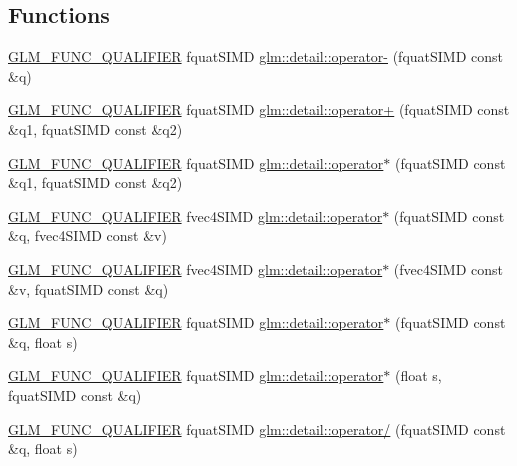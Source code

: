 \subsection*{Functions}
\begin{DoxyCompactItemize}
\item 
\hyperlink{setup_8hpp_a33fdea6f91c5f834105f7415e2a64407}{G\+L\+M\+\_\+\+F\+U\+N\+C\+\_\+\+Q\+U\+A\+L\+I\+F\+I\+ER} fquat\+S\+I\+MD \hyperlink{namespaceglm_1_1detail_a07dbb5e436fcb64a3c165a15c920a484}{glm\+::detail\+::operator-\/} (fquat\+S\+I\+MD const \&q)
\item 
\hyperlink{setup_8hpp_a33fdea6f91c5f834105f7415e2a64407}{G\+L\+M\+\_\+\+F\+U\+N\+C\+\_\+\+Q\+U\+A\+L\+I\+F\+I\+ER} fquat\+S\+I\+MD \hyperlink{namespaceglm_1_1detail_a0010f5683721f2724e0e00709fc51405}{glm\+::detail\+::operator+} (fquat\+S\+I\+MD const \&q1, fquat\+S\+I\+MD const \&q2)
\item 
\hyperlink{setup_8hpp_a33fdea6f91c5f834105f7415e2a64407}{G\+L\+M\+\_\+\+F\+U\+N\+C\+\_\+\+Q\+U\+A\+L\+I\+F\+I\+ER} fquat\+S\+I\+MD \hyperlink{namespaceglm_1_1detail_a6e7c8ca42117ec6c0c60b765f083557b}{glm\+::detail\+::operator$\ast$} (fquat\+S\+I\+MD const \&q1, fquat\+S\+I\+MD const \&q2)
\item 
\hyperlink{setup_8hpp_a33fdea6f91c5f834105f7415e2a64407}{G\+L\+M\+\_\+\+F\+U\+N\+C\+\_\+\+Q\+U\+A\+L\+I\+F\+I\+ER} fvec4\+S\+I\+MD \hyperlink{namespaceglm_1_1detail_af198c6bb57f5b38b3fd5961b8d9b352e}{glm\+::detail\+::operator$\ast$} (fquat\+S\+I\+MD const \&q, fvec4\+S\+I\+MD const \&v)
\item 
\hyperlink{setup_8hpp_a33fdea6f91c5f834105f7415e2a64407}{G\+L\+M\+\_\+\+F\+U\+N\+C\+\_\+\+Q\+U\+A\+L\+I\+F\+I\+ER} fvec4\+S\+I\+MD \hyperlink{namespaceglm_1_1detail_a8da00ab5a90294ba3a8c7ebcb20a8bed}{glm\+::detail\+::operator$\ast$} (fvec4\+S\+I\+MD const \&v, fquat\+S\+I\+MD const \&q)
\item 
\hyperlink{setup_8hpp_a33fdea6f91c5f834105f7415e2a64407}{G\+L\+M\+\_\+\+F\+U\+N\+C\+\_\+\+Q\+U\+A\+L\+I\+F\+I\+ER} fquat\+S\+I\+MD \hyperlink{namespaceglm_1_1detail_a828cc0ad293110da78ec58305e89ac3a}{glm\+::detail\+::operator$\ast$} (fquat\+S\+I\+MD const \&q, float s)
\item 
\hyperlink{setup_8hpp_a33fdea6f91c5f834105f7415e2a64407}{G\+L\+M\+\_\+\+F\+U\+N\+C\+\_\+\+Q\+U\+A\+L\+I\+F\+I\+ER} fquat\+S\+I\+MD \hyperlink{namespaceglm_1_1detail_a586bbba0bf2940cecf9565510005679a}{glm\+::detail\+::operator$\ast$} (float s, fquat\+S\+I\+MD const \&q)
\item 
\hyperlink{setup_8hpp_a33fdea6f91c5f834105f7415e2a64407}{G\+L\+M\+\_\+\+F\+U\+N\+C\+\_\+\+Q\+U\+A\+L\+I\+F\+I\+ER} fquat\+S\+I\+MD \hyperlink{namespaceglm_1_1detail_a242a463e8c91e55fd54ad6a68016e839}{glm\+::detail\+::operator/} (fquat\+S\+I\+MD const \&q, float s)

\end{DoxyCompactItemize}
